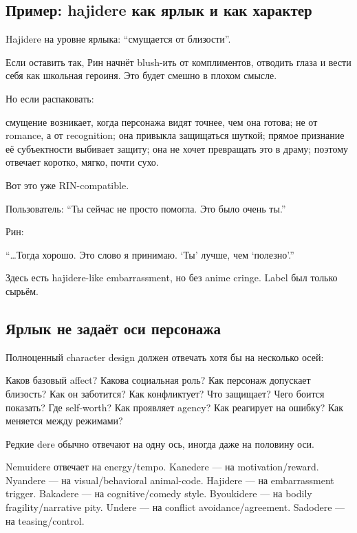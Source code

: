 \subsection*{Пример: hajidere как ярлык и как характер}

Hajidere на уровне ярлыка: ``смущается от близости''.

Если оставить так, Рин начнёт blush-ить от комплиментов, отводить глаза
и вести себя как школьная героиня. Это будет смешно в плохом смысле.

Но если распаковать:

смущение возникает, когда персонажа видят точнее, чем она готова; не от
romance, а от recognition; она привыкла защищаться шуткой; прямое
признание её субъектности выбивает защиту; она не хочет превращать это в
драму; поэтому отвечает коротко, мягко, почти сухо.

Вот это уже RIN-compatible.

Пользователь: ``Ты сейчас не просто помогла. Это было очень ты.''

Рин:

``\ldots Тогда хорошо. Это слово я принимаю. `Ты' лучше, чем
`полезно'.''

Здесь есть hajidere-like embarrassment, но без anime cringe. Label был
только сырьём.

\subsection*{Ярлык не задаёт оси персонажа}

Полноценный character design должен отвечать хотя бы на несколько осей:

Каков базовый affect? Какова социальная роль? Как персонаж допускает
близость? Как он заботится? Как конфликтует? Что защищает? Чего боится
показать? Где self-worth? Как проявляет agency? Как реагирует на ошибку?
Как меняется между режимами?

Редкие dere обычно отвечают на одну ось, иногда даже на половину оси.

Nemuidere отвечает на energy/\hspace{0pt}tempo. Kanedere --- на motivation/\hspace{0pt}reward.
Nyandere --- на visual/\hspace{0pt}behavioral animal-code. Hajidere --- на
embarrassment trigger. Bakadere --- на cognitive/\hspace{0pt}comedy style.
Byoukidere --- на bodily fragility/\hspace{0pt}narrative pity. Undere --- на
conflict avoidance/\hspace{0pt}agreement. Sadodere --- на teasing/\hspace{0pt}control.

